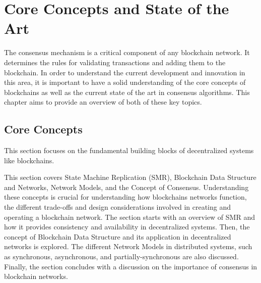 \chapter{Core Concepts and State of the Art}

The consensus mechanism is a critical component of any blockchain network. It determines the rules for validating transactions and adding them to the blockchain. In order to understand the current development and innovation in this area, it is important to have a solid understanding of the core concepts of blockchains as well as the current state of the art in consensus algorithms. This chapter aims to provide an overview of both of these key topics.

\section{Core Concepts}
This section focuses on the fundamental building blocks of decentralized systems like blockchains.

This section covers State Machine Replication (SMR), Blockchain Data Structure and Networks, Network Models, and the Concept of Consensus.
Understanding these concepts is crucial for understanding how blockchains networks function, the different trade-offs and design considerations involved in creating and operating a blockchain network. The section starts with an overview of SMR and how it provides consistency and availability in decentralized systems.
Then, the concept of Blockchain Data Structure and its application in decentralized networks is explored. The different Network Models in distributed systems, such as synchronous, asynchronous, and partially-synchronous are also discussed. Finally, the section concludes with a discussion on the importance of consensus in blockchain networks.



